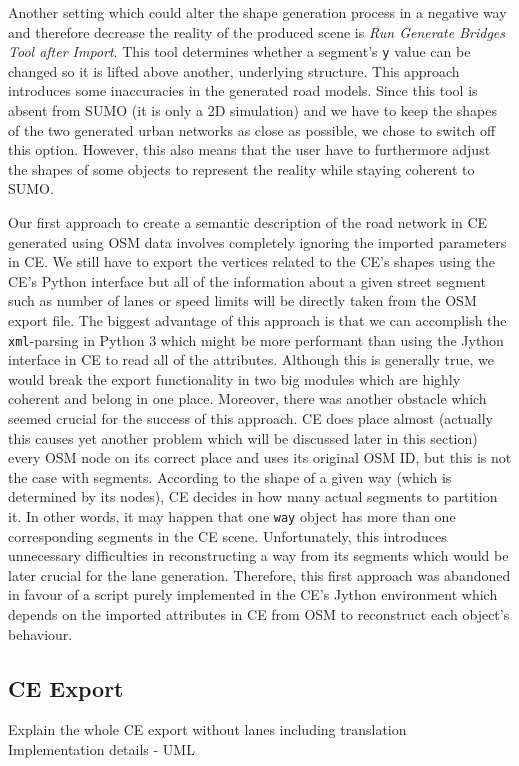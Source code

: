 Another setting which could alter the shape generation process in a negative way and therefore decrease the reality of the produced scene is \emph{Run Generate Bridges Tool after Import}. This tool determines whether a segment's \texttt{y} value can be changed so it is lifted above another, underlying structure. This approach introduces some inaccuracies in the generated road models. Since this tool is absent from SUMO (it is only a 2D simulation) and we have to keep the shapes of the two generated urban networks as close as possible, we chose to switch off this option. However, this also means that the user have to furthermore adjust the shapes of some objects to represent the reality while staying coherent to SUMO.

Our first approach to create a semantic description of the road network in CE generated using OSM data involves completely ignoring the imported parameters in CE. We still have to export the vertices related to the CE's shapes using the CE's Python interface but all of the information about a given street segment such as number of lanes or speed limits will be directly taken from the OSM export file. The biggest advantage of this approach is that we can accomplish the \texttt{xml}-parsing in Python 3 which might be more performant than using the Jython interface in CE to read all of the attributes. Although this is generally true, we would break the export functionality in two big modules which are highly coherent and belong in one place. Moreover, there was another obstacle which seemed crucial for the success of this approach. CE does place almost (actually this causes yet another problem which will be discussed later in this section) every OSM node on its correct place and uses its original OSM ID, but this is not the case with segments. According to the shape of a given way (which is determined by its nodes), CE decides in how many actual segments to partition it. In other words, it may happen that one \texttt{way} object has more than one corresponding segments in the CE scene. Unfortunately, this introduces unnecessary difficulties in reconstructing a way from its segments which would be later crucial for the lane generation. Therefore, this first approach was abandoned in favour of a script purely implemented in the CE's Jython environment which depends on the imported attributes in CE from OSM to reconstruct each object's behaviour. 

\subsection{CE Export}
	Explain the whole CE export without lanes including translation\\
	Implementation details - UML
